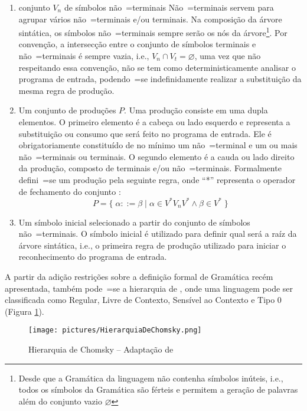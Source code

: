 {\begin{enumerate}
        \item {} conjunto $V_n$ de símbolos
        não~=terminais
        Não~=terminais servem para agrupar vários não~=terminais e/ou terminais.
        Na composição da árvore sintática,
        os símbolos não~=terminais sempre serão os nós da árvore\footnote{Desde
        que a Gramática da linguagem não contenha símbolos inúteis,
        i.e.,
        todos os símbolos da Gramática são férteis e
        permitem a geração de palavras além do conjunto vazio $\varnothing$}.
        Por convenção,
        a intersecção entre o conjunto de símbolos terminais e
        não~=terminais é sempre vazia,
        i.e.,
        $V_n \cap V_t = \varnothing$,
        uma vez que não respeitando essa convenção,
        não se tem como deterministicamente analisar o programa de entrada,
        podendo~=se indefinidamente realizar a substituição da mesma regra de produção.

        \item \label{definicaoDeGramatica}Um conjunto de produções $P$.
        Uma produção consiste em uma dupla elementos.
        O primeiro elemento é a cabeça ou lado esquerdo e
        representa a substituição ou consumo que será feito no programa de entrada.
        Ele é obrigatoriamente constituído de no mínimo um não~=terminal e
        um ou mais não~=terminais ou terminais.
        O segundo elemento é a cauda ou lado direito da produção,
        composto de terminais e/ou não~=terminais.
        Formalmente defini~=se um produção pela seguinte regra,
        onde ``*'' representa o operador de fechamento do conjunto \cite{hopcroftBook}:
        $$P = \{\; \alpha ::= \beta \;|\; \alpha \in V^* V_n V^* \land \beta \in V^* \;\}$$

        \item Um símbolo inicial selecionado a partir do conjunto de símbolos não~=terminais.
        O símbolo inicial é utilizado para definir qual será a raíz da árvore sintática,
        i.e.,
        o primeira regra de produção utilizado para iniciar o reconhecimento do programa de entrada.
    \end{enumerate}

    A partir da adição restrições sobre a definição formal de Gramática recém apresentada,
    também pode~=se  a hierarquia de
    ,
    onde uma linguagem pode ser classificada como Regular,
    Livre de Contexto,
    Sensível ao Contexto e
    Tipo 0 (Figura \ref{fig:pictures/HierarquiaDeChomsky.png}).
    \begin{figure}[H]
    \centering
    \texttt{[image: pictures/HierarquiaDeChomsky.png]}
    \caption{Hierarquia de Chomsky -- Adaptação de }
    \label{fig:pictures/HierarquiaDeChomsky.png}
    \end{figure}

}
